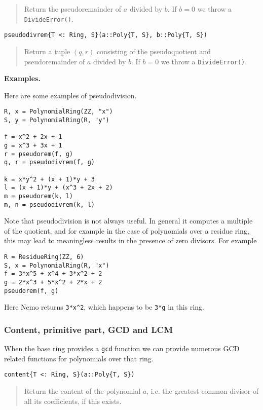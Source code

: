 \documentclass[a4paper,10pt]{article}
\newcommand{\code}{\lstinline}
\newcommand{\desc}[1]{\vspace{-3mm}\begin{quote}#1\end{quote}}
\begin{document}
{{{\desc{Return the pseudoremainder of $a$ divided by $b$. If $b = 0$ we throw a 
\code{DivideError()}.}

\begin{lstlisting}
pseudodivrem{T <: Ring, S}(a::Poly{T, S}, b::Poly{T, S})
\end{lstlisting}

\desc{Return a tuple $(q, r)$ consisting of the pseudoquotient and pseudoremainder 
of $a$ divided by $b$. If $b = 0$ we throw a \code{DivideError()}.}

\textbf{Examples.}

Here are some examples of pseudodivision.

\begin{lstlisting}
R, x = PolynomialRing(ZZ, "x")
S, y = PolynomialRing(R, "y")

f = x^2 + 2x + 1
g = x^3 + 3x + 1
r = pseudorem(f, g)
q, r = pseudodivrem(f, g)

k = x*y^2 + (x + 1)*y + 3
l = (x + 1)*y + (x^3 + 2x + 2)
m = pseudorem(k, l)
m, n = pseudodivrem(k, l)
\end{lstlisting}

Note that pseudodivision is not always useful. In general it computes a
multiple of the quotient, and for example in the case of polynomials over a
residue ring, this may lead to meaningless results in the presence of zero
divisors. For example

\begin{lstlisting}
R = ResidueRing(ZZ, 6)
S, x = PolynomialRing(R, "x")
f = 3*x^5 + x^4 + 3*x^2 + 2
g = 2*x^3 + 5*x^2 + 2*x + 2
pseudorem(f, g)
\end{lstlisting}

Here Nemo returns \code{3*x^2}, which happens to be \code{3*g} in this
ring.

\subsubsection{Content, primitive part, GCD and LCM}

When the base ring provides a \code{gcd} function we can provide numerous
GCD related functions for polynomials over that ring.

\begin{lstlisting}
content{T <: Ring, S}(a::Poly{T, S})
\end{lstlisting}

\desc{Return the content of the polynomial $a$, i.e. the greatest common divisor
of all its coefficients, if this exists.}

}}}
\end{document}
